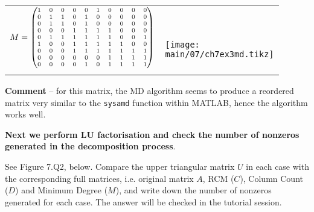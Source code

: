 \begin{enumerate}
\begin{center}
\begin{tabular}{p{0.45\linewidth}|p{0.45\linewidth}}
            $\scriptsize M = \begin{pmatrix}
                1 & 0 & 0 & 0 & 0 & 1 & 0 & 0 & 0 & 0\\
                0 & 1 & 1 & 0 & 1 & 0 & 0 & 0 & 0 & 0\\
                0 & 1 & 1 & 0 & 1 & 0 & 0 & 0 & 0 & 0\\
                0 & 0 & 0 & 1 & 1 & 1 & 1 & 0 & 0 & 0\\
                0 & 1 & 1 & 1 & 1 & 1 & 1 & 0 & 0 & 1\\
                1 & 0 & 0 & 1 & 1 & 1 & 1 & 1 & 0 & 0\\
                0 & 0 & 0 & 1 & 1 & 1 & 1 & 1 & 1 & 1\\
                0 & 0 & 0 & 0 & 0 & 0 & 1 & 1 & 1 & 1\\
                0 & 0 & 0 & 0 & 1 & 0 & 1 & 1 & 1 & 1
            \end{pmatrix}$ &
            ~\vspace{-2em}

            \centering\texttt{[image: main/07/ch7ex3md.tikz]}
            \arraybackslash\\
             &
            \\
        \end{tabular}
    \end{center}

    \textbf{Comment} -- for this matrix, the MD algorithm seems to produce a
    reordered matrix very similar to the \texttt{sysamd} function within MATLAB,
    hence the algorithm works well.

    \textbf{Next we perform LU factorisation and check the number of nonzeros
    generated in the decomposition process}.

    See Figure 7.Q2, below. Compare the upper triangular matrix $U$ in each case
    with the corresponding full matrices, i.e. original matrix $A$, RCM ($C$),
    Column Count ($D$) and Minimum Degree ($M$), and write down the number of
    nonzeros generated for each case.
    The answer will be checked in the tutorial session.


\end{enumerate}
